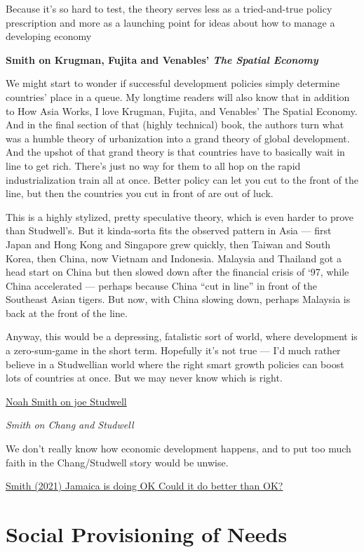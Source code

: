 \documentclass[
]{book}
\begin{document}
Because it's so hard to test, the theory serves less as a tried-and-true policy prescription and more as a launching point for ideas about how to manage a developing economy

\textbf{Smith on Krugman, Fujita and Venables' \emph{The Spatial Economy} }

We might start to wonder if successful development policies simply determine countries' place in a queue. My longtime readers will also know that in addition to How Asia Works, I love Krugman, Fujita, and Venables' The Spatial Economy. And in the final section of that (highly technical) book, the authors turn what was a humble theory of urbanization into a grand theory of global development. And the upshot of that grand theory is that countries have to basically wait in line to get rich. There's just no way for them to all hop on the rapid industrialization train all at once. Better policy can let you cut to the front of the line, but then the countries you cut in front of are out of luck.

This is a highly stylized, pretty speculative theory, which is even harder to prove than Studwell's. But it kinda-sorta fits the observed pattern in Asia --- first Japan and Hong Kong and Singapore grew quickly, then Taiwan and South Korea, then China, now Vietnam and Indonesia. Malaysia and Thailand got a head start on China but then slowed down after the financial crisis of `97, while China accelerated --- perhaps because China ``cut in line'' in front of the Southeast Asian tigers. But now, with China slowing down, perhaps Malaysia is back at the front of the line.

Anyway, this would be a depressing, fatalistic sort of world, where development is a zero-sum-game in the short term. Hopefully it's not true --- I'd much rather believe in a Studwellian world where the right smart growth policies can boost lots of countries at once. But we may never know which is right.

\href{https://noahpinion.substack.com/p/what-studwell-got-wrong}{Noah Smith on joe Studwell}

\emph{Smith on Chang and Studwell}

We don't really know how economic development happens, and to put too much faith in the Chang/Studwell story would be unwise.

\href{https://noahpinion.subst\%20ack.com/p/jamaica-is-doing-ok}{Smith (2021) Jamaica is doing OK Could it do better than OK?}

\hypertarget{social-provisioning-of-needs}{%
\section{Social Provisioning of Needs}\label{social-provisioning-of-needs}}
\end{document}
